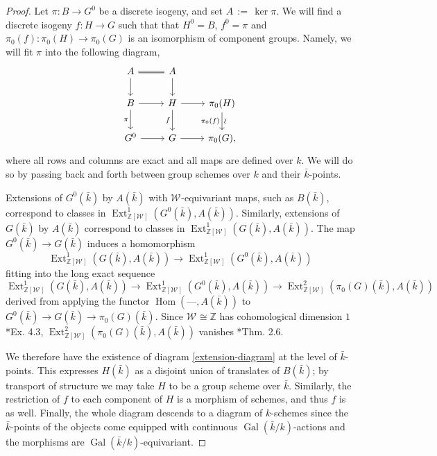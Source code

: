 \documentclass[10pt]{amsart}
\theoremstyle{plain}
\theoremstyle{definition}
\theoremstyle{remark}
\newcommand{\ZZ}{{\mathbb{Z}}}
\newcommand{\bFq}{\bar{k}}
\newcommand{\Fq}{k}
\newcommand{\Weil}[1]{\mathcal{W}_{#1}}
\DeclareMathOperator{\Gal}{Gal}
\DeclareMathOperator{\Hom}{Hom}
\DeclareMathOperator{\Ext}{Ext}
\newcommand{\ceq}{{\, :=\, }}
\begin{document}
\begin{proof}
Let $\pi: B \to G^0$ be a discrete isogeny, and set $A \ceq \ker \pi$.
  We will find a discrete isogeny $f: H\to G$
  such that that $H^0 = B$, $f^0 =\pi$ and
  $\pi_0(f) : \pi_0(H)\to \pi_0(G)$ is an isomorphism of component
  groups.  Namely, we will fit $\pi$ into the following diagram,
  \begin{equation}\label{extension-diagram}
  \begin{tikzcd}
  A \arrow[equal]{r} \dar & A \dar \\
  B \rar \dar[swap]{\pi} & H \rar \dar[swap]{f} & \pi_0(H) \arrow{d}[below,rotate=90]{\sim}[swap]{\pi_0(f)} \\
  G^0 \rar & G \rar & \pi_0(G),
  \end{tikzcd}
  \end{equation}
  where all rows and columns are exact and all maps are defined over
  $\Fq$.  We will do so by passing back and forth between group
  schemes over $\Fq$ and their $\bFq$-points.

  Extensions of $G^0(\bFq)$ by $A(\bFq)$ with $\Weil{}$-equivariant maps, such as $B(\bFq)$,
  correspond to classes in $\Ext^1_{\ZZ[\Weil{}]}(G^0(\bFq), A(\bFq))$.
  Similarly, extensions of $G(\bFq)$ by $A(\bFq)$ correspond to
  classes in $\Ext^1_{\ZZ[\Weil{}]}(G(\bFq), A(\bFq))$.  The map
  $G^0(\bFq) \to G(\bFq)$ induces a homomorphism
  \[
  \Ext^1_{\ZZ[\Weil{}]}(G(\bFq), A(\bFq)) \to \Ext^1_{\ZZ[\Weil{}]}(G^0(\bFq), A(\bFq))
  \]
  fitting into the long exact sequence 
  \[
  \Ext^1_{\ZZ[\Weil{}]}(G(\bFq), A(\bFq)) \to \Ext^1_{\ZZ[\Weil{}]}(G^0(\bFq), A(\bFq)) \to \Ext^2_{\ZZ[\Weil{}]}(\pi_0(G)(\bFq), A(\bFq))
  \]
  derived from applying
  the functor $\Hom(\mbox{---}, A(\bFq))$ to $G^0(\bFq) \to G(\bFq) \to \pi_0(G)(\bFq)$.
  Since $\Weil{} \cong \ZZ$ has cohomological dimension $1$ \cite{brown:CohomologyGrps}*{Ex. 4.3},
  $\Ext^2_{\ZZ[\Weil{}]}(\pi_0(G)(\bFq), A(\bFq))$ vanishes \cite{cartan-eilenberg:HomologicalAlgebra}*{Thm. 2.6}.

  We therefore have the existence of diagram \eqref{extension-diagram}
  at the level of $\bFq$-points.  This expresses $H(\bFq)$ as a
  disjoint union of translates of $B(\bFq)$; by transport of structure
  we may take $H$ to be a group scheme over $\bFq$.  Similarly, the
  restriction of $f$ to each component of $H$ is a morphism of
  schemes, and thus $f$ is as well.  Finally, the whole diagram
  descends to a diagram of $\Fq$-schemes since the $\bFq$-points of
  the objects come equipped with continuous $\Gal(\bFq/\Fq)$-actions and the
  morphisms are $\Gal(\bFq/\Fq)$-equivariant.
\end{proof}
\end{document}
